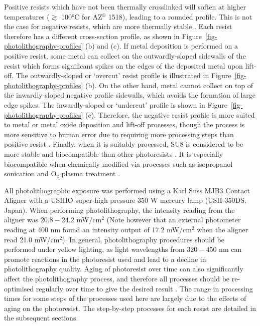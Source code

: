 \documentclass[
  a4paper,
]{scrbook}
\begin{document}
Positive resists which have not been thermally crosslinked will soften
at higher temperatures (\(\gtrsim\) 100°C for AZ\(^\circledR\) 1518),
leading to a rounded profile. This is not the case for negative resists,
which are more thermally stable \autocite{Microchemicals1}. Each resist
therefore has a different cross-section profile, as shown in
Figure~\ref{fig-photolithography-profiles} (b) and (c). If metal
deposition is performed on a positive resist, some metal can collect on
the outwardly-sloped sidewalls of the resist which forms significant
spikes on the edges of the deposited metal upon lift-off. The
outwardly-sloped or `overcut' resist profile is illustrated in
Figure~\ref{fig-photolithography-profiles} (b). On the other hand, metal
cannot collect on top of the inwardly-sloped negative profile sidewalls,
which avoids the formation of large edge spikes. The inwardly-sloped or
`undercut' profile is shown in
Figure~\ref{fig-photolithography-profiles} (c). Therefore, the negative
resist profile is more suited to metal or metal oxide deposition and
lift-off processes, though the process is more sensitive to human error
due to requiring more processing steps than positive resist
\autocite{Microchemicals1}. Finally, when it is suitably processed, SU8
is considered to be more stable and biocompatible than other
photoresists \autocite{Albarghouthi2022}. It is especially biocompatible
when chemically modified via processes such as isopropanol sonication
and O\(_2\) plasma treatment \autocite{Chen2021}.

All photolithographic exposure was performed using a Karl Suss MJB3
Contact Aligner with a USHIO super-high pressure 350 W mercury lamp
(USH-350DS, Japan). When performing photolithography, the intensity
reading from the aligner was \(20.8-24.2\) mW/cm\(^2\) (Note however
that an external photometer reading at 400 nm found an intensity output
of 17.2 mW/cm\(^2\) when the aligner read 21.0 mW/cm\(^2\)). In general,
photolithography procedures should be performed under yellow lighting,
as light wavelengths from \(320-450\) nm can promote reactions in the
photoresist used and lead to a decline in photolithography quality.
Aging of photoresist over time can also significantly affect the
photolithography process, and therefore all processes should be
re-optimised regularly over time to give the desired result
\autocite{Microchemicals1}. The range in processing times for some steps
of the processes used here are largely due to the effects of aging on
the photoresist. The step-by-step processes for each resist are detailed
in the subsequent sections.
\end{document}
